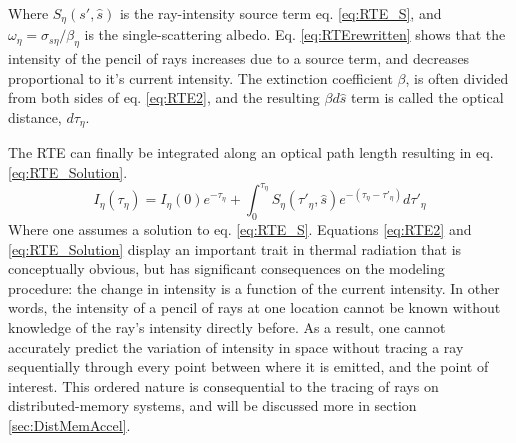 Where $S_\eta{}(s',\hat{s})$ is the ray-intensity source term eq. \ref{eq:RTE_S}, and $\omega{}_\eta{}=\sigma{}_{s\eta{}}/\beta_{\eta{}}$ is the single-scattering albedo. Eq. \ref{eq:RTErewritten} shows that the intensity of the pencil of rays increases due to a source term, and decreases proportional to it's current intensity.
The extinction coefficient $\beta{}$, is often divided from both sides of eq. \ref{eq:RTE2}, and the resulting $\beta{}d\hat{s}$ term is called the optical distance, $d\tau{}_\eta{}$.

The RTE can finally be integrated along an optical path length resulting in eq. \ref{eq:RTE_Solution}.
\begin{equation}
    I_\eta{}(\tau{}_\eta{}) = I_\eta{}(0)e^{-\tau{}_\eta{}}+\int_{0}^{\tau{}_\eta{}}{S_\eta{}(\tau{}'_\eta{},\hat{s})e^{-(\tau{}_\eta{}-\tau{}'_\eta{})}}d\tau{}'_\eta{}
    \label{eq:RTE_Solution}
\end{equation}
Where one assumes a solution to eq. \ref{eq:RTE_S}. Equations \ref{eq:RTE2} and \ref{eq:RTE_Solution} display an important trait in thermal radiation that is conceptually obvious, but has significant consequences on the modeling procedure:
the change in intensity is a function of the current intensity. In other words, the intensity of a pencil of rays at one location cannot be known without knowledge of the ray's intensity directly before.
As a result, one cannot accurately predict the variation of intensity in space without tracing a ray sequentially through every point between where it is emitted, and the point of interest.
This ordered nature is consequential to the tracing of rays on distributed-memory systems, and will be discussed more in section \ref{sec:DistMemAccel}.


